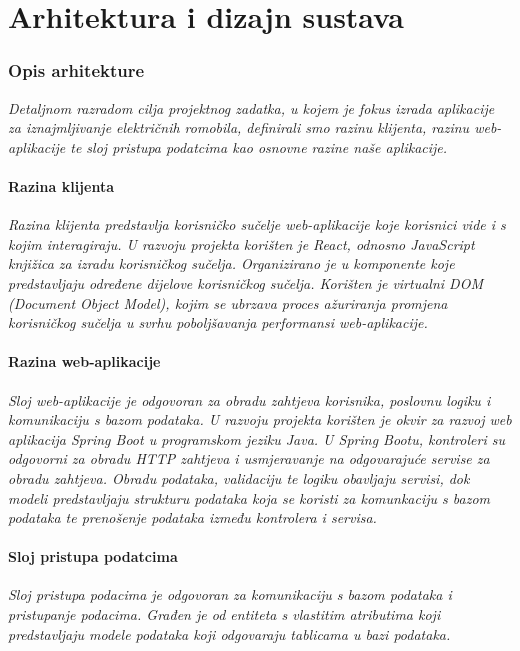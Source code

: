 \chapter{Arhitektura i dizajn sustava}

\subsection{Opis arhitekture}

\textit{Detaljnom razradom cilja projektnog zadatka, u kojem je fokus izrada aplikacije za iznajmljivanje električnih romobila, definirali smo razinu klijenta, razinu web-aplikacije te sloj pristupa podatcima kao osnovne razine naše aplikacije.}

\subsubsection{Razina klijenta}

\textit{Razina klijenta predstavlja korisničko sučelje web-aplikacije koje korisnici vide i s kojim interagiraju. U razvoju projekta korišten je React, odnosno JavaScript knjižica za izradu korisničkog sučelja. Organizirano je u komponente koje predstavljaju određene dijelove korisničkog sučelja. Korišten je virtualni DOM (Document Object Model), kojim se ubrzava proces ažuriranja promjena korisničkog sučelja u svrhu poboljšavanja performansi web-aplikacije. }
\subsubsection{Razina web-aplikacije}

\textit{Sloj web-aplikacije je odgovoran za obradu zahtjeva korisnika, poslovnu logiku i komunikaciju s bazom podataka. U razvoju projekta korišten je okvir za razvoj web aplikacija Spring Boot u programskom jeziku Java. U Spring Bootu, kontroleri su odgovorni za obradu HTTP zahtjeva i usmjeravanje na odgovarajuće servise za obradu zahtjeva. Obradu podataka, validaciju te logiku obavljaju servisi, dok modeli predstavljaju strukturu podataka koja se koristi za komunkaciju s bazom podataka te prenošenje podataka između kontrolera i servisa.}
\subsubsection{Sloj pristupa podatcima}

\textit{Sloj pristupa podacima je odgovoran za komunikaciju s bazom podataka i pristupanje podacima. Građen je od entiteta s vlastitim atributima koji predstavljaju modele podataka koji odgovaraju tablicama u bazi podataka.}

